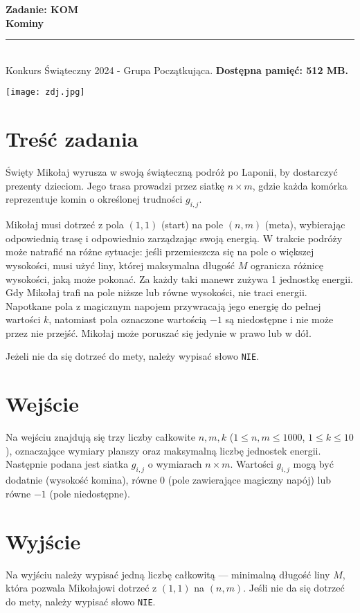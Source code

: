 \documentclass[a4paper,11pt]{article}
\newcommand{\tasktitle}{Kominy}
\newcommand{\taskshort}{KOM}
\newcommand{\contestinfo}{Konkurs Świąteczny 2024 - Grupa Początkująca.}
\newcommand{\memorylimit}{512 MB}
\begin{document}
\noindent\textbf{\LARGE Zadanie: \taskshort} \\
\textbf{\Large \tasktitle} \\
\rule{\textwidth}{0.4pt} \\
\small \contestinfo \textbf{ Dostępna pamięć: \memorylimit.}

\begin{center}
\texttt{[image: zdj.jpg]}
\end{center}

\section*{Tre\'s\'c zadania}
\noindent\normalsize
Święty Mikołaj wyrusza w swoją świąteczną podróż po Laponii, by dostarczyć prezenty dzieciom. Jego trasa prowadzi przez siatkę \( n \times m \), gdzie każda komórka reprezentuje komin o określonej trudności \( g_{i,j} \).

Mikołaj musi dotrzeć z pola \((1, 1)\) (start) na pole \((n, m)\) (meta), wybierając odpowiednią trasę i odpowiednio zarządzając swoją energią. W trakcie podróży może natrafić na różne sytuacje: jeśli przemieszcza się na pole o większej wysokości, musi użyć liny, której maksymalna długość \( M \) ogranicza różnicę wysokości, jaką może pokonać. Za każdy taki manewr zużywa 1 jednostkę energii. Gdy Mikołaj trafi na pole niższe lub równe wysokości, nie traci energii. Napotkane pola z magicznym napojem przywracają jego energię do pełnej wartości \( k \), natomiast pola oznaczone wartością \( -1 \) są niedostępne i nie może przez nie przejść. Mikołaj może poruszać się jedynie w prawo lub w dół.

Jeżeli nie da się dotrzeć do mety, należy wypisać słowo \texttt{NIE}.

\section*{Wejście}
Na wejściu znajdują się trzy liczby całkowite \( n, m, k \) ($1 \leq n, m \leq 1000$, \( 1 \leq k \leq 10 \)), oznaczające wymiary planszy oraz maksymalną liczbę jednostek energii. Następnie podana jest siatka \( g_{i,j} \) o wymiarach \( n \times m \). Wartości \( g_{i,j} \) mogą być dodatnie (wysokość komina), równe 0 (pole zawierające magiczny napój) lub równe \( -1 \) (pole niedostępne).

\section*{Wyjście}
Na wyjściu należy wypisać jedną liczbę całkowitą — minimalną długość liny \( M \), która pozwala Mikołajowi dotrzeć z \( (1, 1) \) na \( (n, m) \). Jeśli nie da się dotrzeć do mety, należy wypisać słowo \texttt{NIE}.
\newpage
\end{document}
